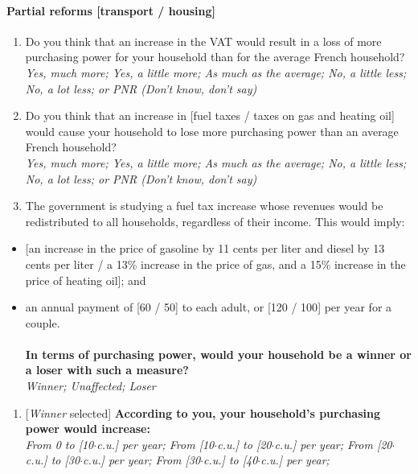 \documentclass[12pt]{article} %
\begin{document}
\begin{appendices}
\paragraph{Partial reforms {[}transport / housing{]}}
\begin{enumerate}[resume,leftmargin=*]
\item Do you think that an increase in the VAT would result in a loss of more
purchasing power for your household than for the average French household?
\emph{}\\
\emph{Yes, much more; Yes, a little more; As much as the average;
No, a little less; No, a lot less; or PNR (Don't know, don't say)} 
\item Do you think that an increase in {[}fuel taxes / taxes on gas and
heating oil{]} would cause your household to lose more purchasing
power than an average French household? \emph{}\\
\emph{Yes, much more; Yes, a little more; As much as the average;
No, a little less; No, a lot less; or PNR (Don't know, don't say)}
\item The government is studying a fuel tax increase whose revenues would
be redistributed to all households, regardless of their income. This
would imply: 
\end{enumerate}
\begin{itemize}
\item {[}an increase in the price of gasoline by 11 cents per liter and
diesel by 13 cents per liter / a 13\% increase in the price of gas,
and a 15\% increase in the price of heating oil{]}; and 
\item an annual payment of {[}60 / 50{]}\euros{} to each adult, or {[}120 / 100{]}\euros{}
per year for a couple. \\
\\
\textbf{In terms of purchasing power, would your household be a winner
or a loser with such a measure?} \emph{}\\
\emph{Winner; Unaffected; Loser} 
\end{itemize}
\begin{enumerate}[resume,leftmargin=*]
\item {[}\emph{Winner} selected{]} \textbf{According to you, your household's
purchasing power would increase:} \emph{}\\
\emph{From 0 to {[}10$\cdot$c.u.{]} \euros{} per year; From {[}10$\cdot$c.u.{]}
to {[}20$\cdot$c.u.{]} \euros{} per year; From {[}20$\cdot$c.u.{]} to {[}30$\cdot$c.u.{]}
\euros{} per year; From {[}30$\cdot$c.u.{]} to {[}40$\cdot$c.u.{]} \euros{} per year;
}
\end{enumerate}
\end{appendices}
\end{document}
